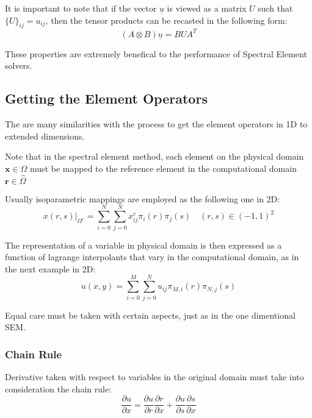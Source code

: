 \documentclass[
  a4paper,
  10pt]{article}
\begin{document}
It is important to note that if the vector \(\underline{u}\) is viewed
as a matrix \(U\) such that \(\{U\}_{ij}=u_{ij}\), then the tensor
products can be recasted in the following form: \begin{equation}
        (A \otimes B)\underline{u} = BUA^{T}
    \end{equation}

These properties are extremely benefical to the performance of Spectral
Element solvers.

\hypertarget{getting-the-element-operators}{%
\subsection{Getting the Element
Operators}\label{getting-the-element-operators}}

The are many similarities with the process to get the element operators
in 1D to extended dimensions.

Note that in the spectral element method, each element on the physical
domain \(\textbf{x} \in \Omega\) must be mapped to the reference element
in the computational domain \(\textbf{r} \in \hat{\Omega}\)

Usually isoparametric mappings are employed as the following one in 2D:
\begin{equation}
\left.x(r,s)\right\rvert_{\Omega^{e}}=\sum_{i=0}^{N}\sum_{j=0}^{N} x_{ij}^{e} \pi_{i}(r) \pi_{j}(s) \quad (r,s) \in (-1,1)^{2}
\end{equation}

The representation of a variable in physical domain is then expressed as
a function of lagrange interpolants that vary in the computational
domain, as in the next example in 2D: \begin{equation}
    u(x,y)=\sum_{i=0}^{M}\sum_{j=0}^{N} u_{ij} \pi_{M,i}(r) \pi_{N,j}(s) 
\end{equation}

Equal care must be taken with certain aspects, just as in the one
dimentional SEM.

\hypertarget{chain-rule-1}{%
\subsubsection{Chain Rule}\label{chain-rule-1}}

Derivative taken with respect to variables in the original domain must
take into consideration the chain rule: \begin{equation}
    \frac{\partial u}{\partial x}=\frac{\partial u}{\partial r}\frac{\partial r}{\partial x}+\frac{\partial u}{\partial s}\frac{\partial s}{\partial x} 
\end{equation}
\end{document}
